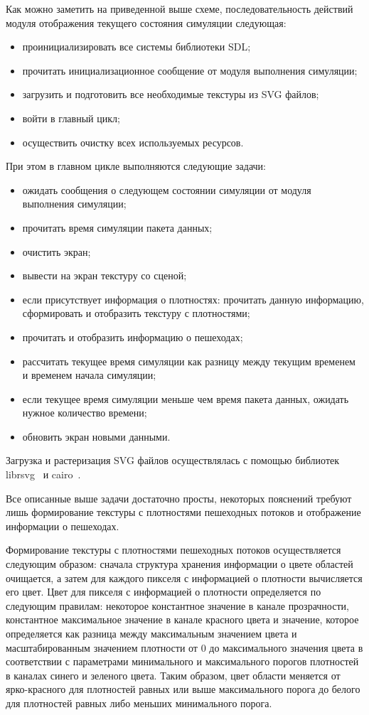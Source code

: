 Как можно заметить на приведенной выше схеме, последовательность действий модуля отображения текущего состояния симуляции следующая:
\begin{itemize}
  \item проинициализировать все системы библиотеки SDL;
  \item прочитать инициализационное сообщение от модуля выполнения симуляции;
  \item загрузить и подготовить все необходимые текстуры из SVG файлов;
  \item войти в главный цикл;
  \item осуществить очистку всех используемых ресурсов.
\end{itemize}

При этом в главном цикле выполняются следующие задачи:
\begin{itemize}
  \item ожидать сообщения о следующем состоянии симуляции от модуля выполнения симуляции;
  \item прочитать время симуляции пакета данных;
  \item очистить экран;
  \item вывести на экран текстуру со сценой;
  \item если присутствует информация о плотностях: прочитать данную информацию, сформировать и отобразить текстуру с плотностями;
  \item прочитать и отобразить информацию о пешеходах;
  \item рассчитать текущее время симуляции как разницу между текущим временем и временем начала симуляции;
  \item если текущее время симуляции меньше чем время пакета данных, ожидать нужное количество времени;
  \item обновить экран новыми данными.
\end{itemize}

Загрузка и растеризация SVG файлов осуществлялась с помощью библиотек librsvg~\cite{librsvg_home} и cairo~\cite{cairo_home}.

Все описанные выше задачи достаточно просты, некоторых пояснений требуют лишь формирование текстуры с плотностями пешеходных потоков и отображение информации о пешеходах.

Формирование текстуры с плотностями пешеходных потоков осуществляется следующим образом:
сначала структура хранения информации о цвете областей очищается,
а затем для каждого пикселя с информацией о плотности вычисляется его цвет.
Цвет для пикселя с информацией о плотности определяется по следующим правилам:
некоторое константное значение в канале прозрачности,
константное максимальное значение в канале красного цвета и
значение, которое определяется как разница между максимальным значением цвета и масштабированным значением плотности от 0 до максимального значения цвета
в соответствии с параметрами минимального и максимального порогов плотностей в каналах синего и зеленого цвета.
Таким образом, цвет области меняется от ярко-красного для плотностей равных или выше максимального порога до белого для плотностей равных либо меньших минимального порога.

